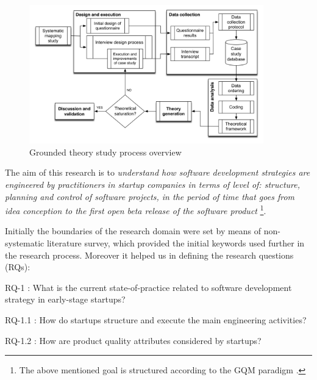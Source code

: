 \documentclass[10pt,journal,letterpaper,compsoc]{IEEEtran}
\begin{document}
\begin{figure}[!t]
\centering
\includegraphics[width=4in]{figures/completemethodology2}
\caption{Grounded theory study process overview}\label{fig:gt:completemethodology}
\end{figure}


The aim of this research is to \textit{understand how software development strategies are engineered by practitioners in startup companies in terms of level of: structure, planning and control of software projects, in the period of time  that goes from idea conception to the first open beta release of the software product} \footnote{The above mentioned goal is structured according to the GQM paradigm \cite{Basili1992}.}.

Initially the boundaries of the research domain were set by means of non-systematic literature survey, which provided the initial keywords used further in the research process. Moreover it helped us in defining the research questions (RQs):


\begin{compactitem}

\item RQ-1 : What is the current state-of-practice related to software development strategy in early-stage startups?
\begin{compactitem}

\item RQ-1.1 : How do startups structure and execute the main engineering activities?
\item RQ-1.2 : How are product quality attributes considered by startups?
\end{compactitem}

\end{compactitem}
\end{document}
